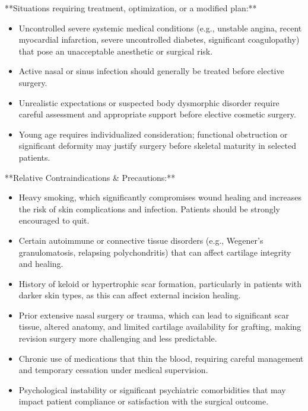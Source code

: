 **Situations requiring treatment, optimization, or a modified plan:**
\begin{itemize}
  \item Uncontrolled severe systemic medical conditions (e.g., unstable angina, recent myocardial infarction, severe uncontrolled diabetes, significant coagulopathy) that pose an unacceptable anesthetic or surgical risk.
  
  \item Active nasal or sinus infection should generally be treated before elective surgery.
  
  \item Unrealistic expectations or suspected body dysmorphic disorder require careful assessment and appropriate support before elective cosmetic surgery.
  
  \item Young age requires individualized consideration; functional obstruction or significant deformity may justify surgery before skeletal maturity in selected patients.
\end{itemize}

**Relative Contraindications \& Precautions:**
\begin{itemize}
  \item Heavy smoking, which significantly compromises wound healing and increases the risk of skin complications and infection. Patients should be strongly encouraged to quit.
  
  \item Certain autoimmune or connective tissue disorders (e.g., Wegener's granulomatosis, relapsing polychondritis) that can affect cartilage integrity and healing.
  
  \item History of keloid or hypertrophic scar formation, particularly in patients with darker skin types, as this can affect external incision healing.
  
  \item Prior extensive nasal surgery or trauma, which can lead to significant scar tissue, altered anatomy, and limited cartilage availability for grafting, making revision surgery more challenging and less predictable.
  
  \item Chronic use of medications that thin the blood, requiring careful management and temporary cessation under medical supervision.
  
  \item Psychological instability or significant psychiatric comorbidities that may impact patient compliance or satisfaction with the surgical outcome.
\end{itemize}

